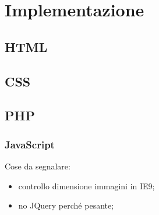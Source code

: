 \section{Implementazione}
\label{implementazione}

\subsection{HTML}
\label{implementazione-back-end-HTML}

\subsection{CSS}
\label{implementazione-front-end-CSS}

\subsection{PHP}
\label{implementazione-back-end-PHP}

\subsubsection{JavaScript}
\label{implementazione-front-end-JavaScript}
Cose da segnalare:
\begin{itemize}
	\item controllo dimensione immagini in IE9;
	\item no JQuery perché pesante;
\end{itemize}